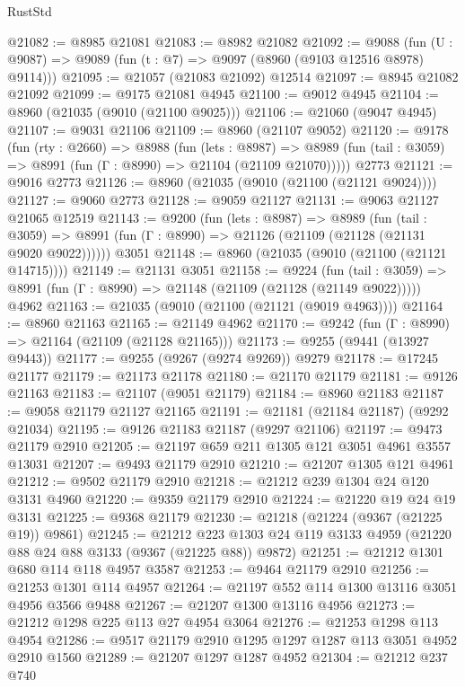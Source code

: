 \begin{lexlean}{RustStd}
\begin{coremodule}
@21082 := @8985 @21081
@21083 := @8982 @21082
@21092 := @9088
    (fun (U : @9087) => @9089 (fun (t : @7) => @9097 (@8960 (@9103 @12516 @8978) @9114)))
@21095 := @21057 (@21083 @21092) @12514
@21097 := @8945 @21082 @21092
@21099 := @9175 @21081 @4945
@21100 := @9012 @4945
@21104 := @8960 (@21035 (@9010 (@21100 @9025)))
@21106 := @21060 (@9047 @4945)
@21107 := @9031 @21106
@21109 := @8960 (@21107 @9052)
@21120 := @9178
    (fun (rty : @2660) =>
    @8988
      (fun (lets : @8987) =>
      @8989 (fun (tail : @3059) => @8991 (fun (Γ : @8990) => @21104 (@21109 @21070)))))
    @2773
@21121 := @9016 @2773
@21126 := @8960 (@21035 (@9010 (@21100 (@21121 @9024))))
@21127 := @9060 @2773
@21128 := @9059 @21127
@21131 := @9063 @21127 @21065 @12519
@21143 := @9200
    (fun (lets : @8987) =>
    @8989
      (fun (tail : @3059) =>
      @8991 (fun (Γ : @8990) => @21126 (@21109 (@21128 (@21131 @9020 @9022))))))
    @3051
@21148 := @8960 (@21035 (@9010 (@21100 (@21121 @14715))))
@21149 := @21131 @3051
@21158 := @9224
    (fun (tail : @3059) => @8991 (fun (Γ : @8990) => @21148 (@21109 (@21128 (@21149 @9022)))))
    @4962
@21163 := @21035 (@9010 (@21100 (@21121 (@9019 @4963))))
@21164 := @8960 @21163
@21165 := @21149 @4962
@21170 := @9242 (fun (Γ : @8990) => @21164 (@21109 (@21128 @21165)))
@21173 := @9255 (@9441 (@13927 @9443))
@21177 := @9255 (@9267 (@9274 @9269)) @9279
@21178 := @17245 @21177
@21179 := @21173 @21178
@21180 := @21170 @21179
@21181 := @9126 @21163
@21183 := @21107 (@9051 @21179)
@21184 := @8960 @21183
@21187 := @9058 @21179 @21127 @21165
@21191 := @21181 (@21184 @21187) (@9292 @21034)
@21195 := @9126 @21183 @21187 (@9297 @21106)
@21197 := @9473 @21179 @2910
@21205 := @21197 @659 @211 @1305 @121 @3051 @4961 @3557 @13031
@21207 := @9493 @21179 @2910
@21210 := @21207 @1305 @121 @4961
@21212 := @9502 @21179 @2910
@21218 := @21212 @239 @1304 @24 @120 @3131 @4960
@21220 := @9359 @21179 @2910
@21224 := @21220 @19 @24 @19 @3131
@21225 := @9368 @21179
@21230 := @21218 (@21224 (@9367 (@21225 @19)) @9861)
@21245 := @21212
    @223
    @1303
    @24
    @119
    @3133
    @4959
    (@21220 @88 @24 @88 @3133 (@9367 (@21225 @88)) @9872)
@21251 := @21212 @1301 @680 @114 @118 @4957 @3587
@21253 := @9464 @21179 @2910
@21256 := @21253 @1301 @114 @4957
@21264 := @21197 @552 @114 @1300 @13116 @3051 @4956 @3566 @9488
@21267 := @21207 @1300 @13116 @4956
@21273 := @21212 @1298 @225 @113 @27 @4954 @3064
@21276 := @21253 @1298 @113 @4954
@21286 := @9517 @21179 @2910 @1295 @1297 @1287 @113 @3051 @4952 @2910 @1560
@21289 := @21207 @1297 @1287 @4952
@21304 := @21212
    @237
    @740

\end{coremodule}
\end{lexlean}
